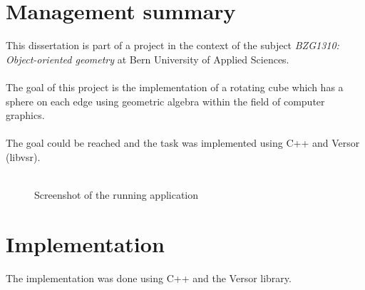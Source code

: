 \documentclass[pdftex,12pt,a4paper]{article}
\begin{document}


\newpage

\section{Management summary}

This dissertation is part of a project in the context of the subject \textit{BZG1310: Object-oriented geometry} at Bern University of Applied Sciences.
\\
\\
The goal of this project is the implementation of a rotating cube which has a sphere on each edge using \gls{geometric algebra} within the field of computer graphics.
\\
\\
The goal could be reached and the task was implemented using C++ and \gls{Versor (libvsr)}.\\
\\
\begin{figure}[htbp]
\centering {}
\caption{Screenshot of the running application \label{fig:screenshot}}
\end{figure}

\section{Implementation}

The implementation was done using C++ and the Versor library.
\end{document}
